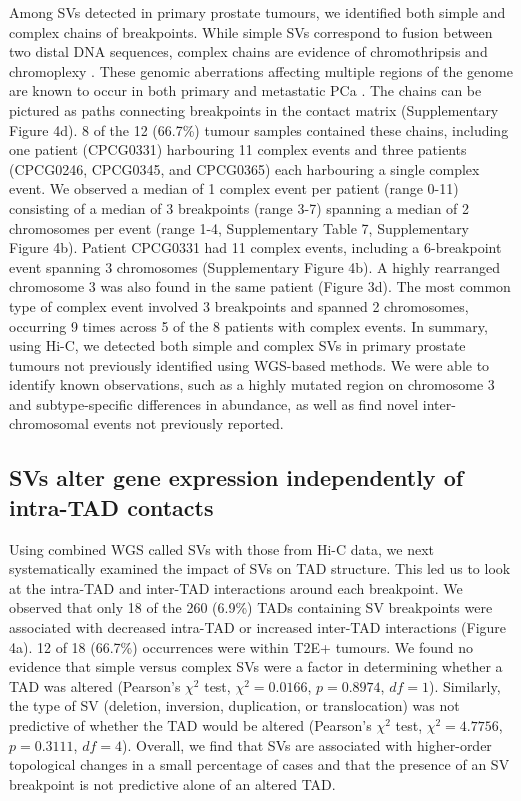 Among SVs detected in primary prostate tumours, we identified both simple and complex chains of breakpoints.
While simple SVs correspond to fusion between two distal DNA sequences, complex chains are evidence of chromothripsis and chromoplexy \cite{bacaPunctuatedEvolutionProstate2013}.
These genomic aberrations affecting multiple regions of the genome are known to occur in both primary and metastatic PCa \cite{bacaPunctuatedEvolutionProstate2013,fraserGenomicHallmarksLocalized2017,liPatternsSomaticStructural2020}.
The chains can be pictured as paths connecting breakpoints in the contact matrix (Supplementary Figure 4d).
8 of the 12 (66.7\%) tumour samples contained these chains, including one patient (CPCG0331) harbouring 11 complex events and three patients (CPCG0246, CPCG0345, and CPCG0365) each harbouring a single complex event.
We observed a median of 1 complex event per patient (range 0-11) consisting of a median of 3 breakpoints (range 3-7) spanning a median of 2 chromosomes per event (range 1-4, Supplementary Table 7, Supplementary Figure 4b).
Patient CPCG0331 had 11 complex events, including a 6-breakpoint event spanning 3 chromosomes (Supplementary Figure 4b).
A highly rearranged chromosome 3 was also found in the same patient (Figure 3d).
The most common type of complex event involved 3 breakpoints and spanned 2 chromosomes, occurring 9 times across 5 of the 8 patients with complex events.
In summary, using Hi-C, we detected both simple and complex SVs in primary prostate tumours not previously identified using WGS-based methods.
We were able to identify known observations, such as a highly mutated region on chromosome 3 and subtype-specific differences in abundance, as well as find novel inter-chromosomal events not previously reported.

\subsection{SVs alter gene expression independently of intra-TAD contacts}

Using combined WGS called SVs with those from Hi-C data, we next systematically examined the impact of SVs on TAD structure.
This led us to look at the intra-TAD and inter-TAD interactions around each breakpoint.
We observed that only 18 of the 260 (6.9\%) TADs containing SV breakpoints were associated with decreased intra-TAD or increased inter-TAD interactions (Figure 4a).
12 of 18 (66.7\%) occurrences were within T2E+ tumours.
We found no evidence that simple versus complex SVs were a factor in determining whether a TAD was altered (Pearson's $\chi^2$ test, $\chi^2 = 0.0166$, $p = 0.8974$, $df = 1$).
Similarly, the type of SV (deletion, inversion, duplication, or translocation) was not predictive of whether the TAD would be altered (Pearson's $\chi^2$ test, $\chi^2 = 4.7756$, $p = 0.3111$, $df = 4$).
Overall, we find that SVs are associated with higher-order topological changes in a small percentage of cases and that the presence of an SV breakpoint is not predictive alone of an altered TAD.

